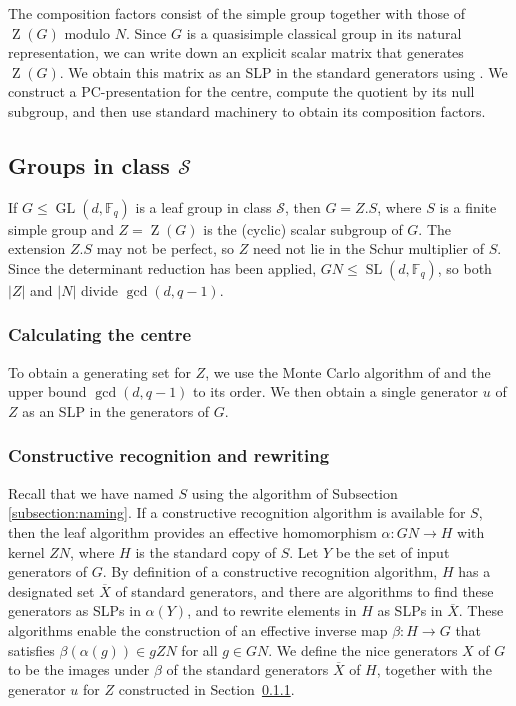 \documentclass[12pt,twoside,reqno,psamsfonts]{amsproc}
\newcommand{\nullsubgp}{{null subgroup}\xspace}
\numberwithin{equation}{section}
\numberwithin{figure}{section}
\newcounter{algorithm}
\theoremstyle{plain}
\theoremstyle{definition}
\theoremstyle{remark}
\providecommand{\abs}[1]{\left\lvert #1 \right\rvert}
\newcommand{\field}[1]{\mathbb{#1}}
\newcommand{\F}{\field{F}}
\newcommand{\cS}{\mathcal{S}}
\DeclareMathOperator{\GL}{GL}
\DeclareMathOperator{\SL}{SL}
\DeclareMathOperator{\Zent}{Z}
\begin{document}
The composition factors consist of the simple group together with those
of $\Zent(G)$ modulo $N$. Since $G$ is a quasisimple classical group in 
its natural representation, we can write down an explicit scalar matrix
that generates $\Zent(G)$. We obtain
this matrix as an SLP in the standard generators using \cite{costi_phd}.
We construct a PC-presentation for the centre, 
compute the quotient by its \nullsubgp, and then use standard 
machinery to obtain its composition factors.

\subsection{Groups in class $\cS$}
\label{section:c9_reduction}

If $G \leqslant \GL(d, \F_q)$ is a leaf group in class $\cS$,
then $G = Z.S$, where $S$ is a finite simple group
and $Z=\Zent(G)$ is the (cyclic) scalar subgroup of $G$. 
The extension $Z.S$ may not be perfect,
so $Z$ need not lie in the Schur multiplier of $S$.
Since the determinant reduction has been applied, 
$GN \leqslant \SL(d, \F_q)$, so both $\abs{Z}$ and $\abs{N}$ 
divide $\gcd(d, q - 1)$.

\subsubsection{Calculating the centre}
\label{subsection:c9_centre}

To obtain a generating set for $Z$, we use the 
Monte Carlo algorithm of \cite[Theorem
4.15]{MR1829470} and the upper bound $\gcd(d, q - 1)$ to its order. 
We then obtain a single generator 
$u$ of $Z$ as an SLP in the generators of $G$. 

\subsubsection{Constructive recognition and rewriting}
\label{subsection:crr}
Recall that we have named $S$ using the algorithm 
of Subsection \ref{subsection:naming}.
If a constructive recognition algorithm is available for $S$,
then the leaf algorithm provides an effective homomorphism
$\alpha : GN \to H$ with kernel $ZN$, where $H$ is the standard copy of $S$.
Let $Y$ be the set of input generators of $G$.
By definition of a constructive recognition algorithm,
$H$ has a designated set $\overline{X}$ of standard generators,
and there are algorithms to find these generators as SLPs in $\alpha(Y)$,
and to rewrite elements in $H$ as SLPs in $\overline{X}$.
These algorithms enable the construction of an effective inverse map
$\beta: H \to G$ that satisfies $\beta(\alpha(g)) \in gZN$ for all $g \in GN$.
We define the nice generators $X$ of $G$ to be the images under $\beta$ of the
standard generators $\overline{X}$ of $H$, together with the generator $u$ for
$Z$ constructed in Section~\ref{subsection:c9_centre}.
\end{document}
